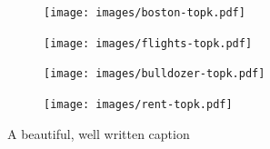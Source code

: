 \documentclass[12pt]{article}
\begin{document}
\begin{figure}[b]
\centering
\begin{subfigure}{.5\textwidth}
    \centering
\texttt{[image: images/boston-topk.pdf]}
\vspace{-2mm}\vspace{3mm}
\end{subfigure}%
\begin{subfigure}{.5\textwidth}
    \centering
\texttt{[image: images/flights-topk.pdf]}
\vspace{-2mm}\vspace{3mm}
\end{subfigure}
\begin{subfigure}{.5\textwidth}
    \centering
\texttt{[image: images/bulldozer-topk.pdf]}
\vspace{-2mm}\vspace{3mm}
\end{subfigure}%
\begin{subfigure}{.5\textwidth}
    \centering
\texttt{[image: images/rent-topk.pdf]}
\vspace{-2mm}\vspace{3mm}
\end{subfigure}
\caption[short]{A beautiful, well written caption}
\label{fig:topk}
\end{figure}
\end{document}
